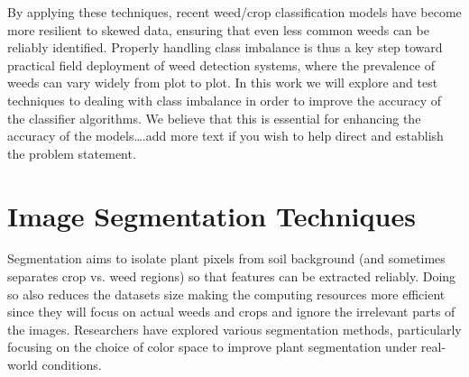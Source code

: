 \documentclass[letterpaper]{report}
\begin{document}
%
%
By applying these techniques, recent weed/crop classification models have become more resilient to skewed data, ensuring that even less common weeds can be reliably identified. Properly handling class imbalance is thus a key step toward practical field deployment of weed detection systems, where the prevalence of weeds can vary widely from plot to plot. In this work we will explore and test
techniques to dealing with class imbalance in order to improve the accuracy of the classifier algorithms. We believe that this is essential for enhancing the accuracy of the models….add more text if you wish to help direct and establish the problem statement.

\section{Image Segmentation Techniques}  
Segmentation aims to isolate plant pixels from soil background (and sometimes separates crop vs. weed regions) so that features can be extracted reliably. Doing so also reduces the datasets size making the computing resources more efficient since they will focus on actual weeds and crops and ignore the irrelevant parts of the images. Researchers have explored various segmentation methods, particularly focusing on the choice of color space to improve plant segmentation under real-world conditions.
%
\end{document}
